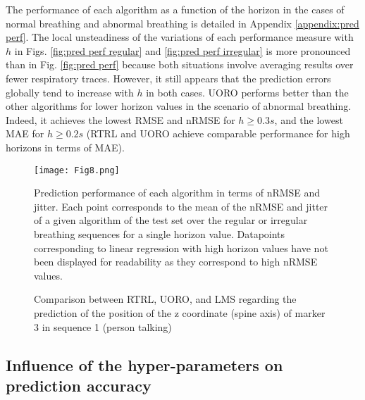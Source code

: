 \documentclass[twocolumn,a4paper]{svjour3} \sloppy          \smartqed
\begin{document}
The performance of each algorithm as a function of the horizon in the cases of normal breathing and abnormal breathing is detailed in Appendix \ref{appendix:pred perf}. The local unsteadiness of the variations of each performance measure with $h$ in Figs. \ref{fig:pred perf regular} and \ref{fig:pred perf irregular} is more pronounced than in Fig. \ref{fig:pred perf} because both situations involve averaging results over fewer respiratory traces. However, it still appears that the prediction errors globally tend to increase with $h$ in both cases. UORO performs better than the other algorithms for lower horizon values in the scenario of abnormal breathing. Indeed, it achieves the lowest RMSE and nRMSE for $h \geq 0.3s$, and the lowest MAE for $h \geq 0.2s$ (RTRL and UORO achieve comparable performance for high horizons in terms of MAE).

\begin{figure}[htb!]
	\centering
		\texttt{[image: Fig8.png]}
	\caption{Prediction performance of each algorithm in terms of nRMSE and jitter. Each point corresponds to the mean of the nRMSE and jitter of a given algorithm of the test set over the regular or irregular breathing sequences for a single horizon value. Datapoints corresponding to linear regression with high horizon values have not been displayed for readability as they correspond to high nRMSE values.}
	\label{fig:nRMSE vs jitter}
\end{figure}

\begin{figure*}[htb!]
    \centering
    \quad
    \quad
    \caption{Comparison between RTRL, UORO, and LMS regarding the prediction of the position of the z coordinate (spine axis) of marker 3 in sequence 1 (person talking)}\label{fig:coordz_marker3_seq1}\end{figure*}


\subsection{Influence of the hyper-parameters on prediction accuracy}
\end{document}
